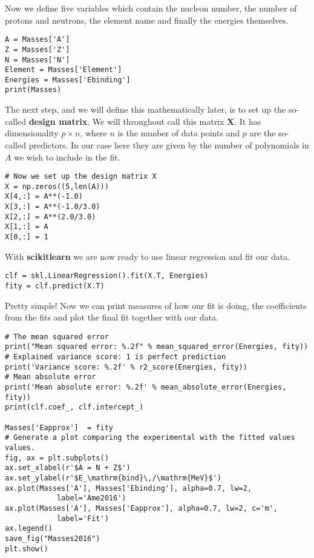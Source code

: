 \documentclass[%
oneside,                 %
final,                   %
10pt]{article}
\begin{document}
Now we define five variables which contain
the nucleon number, the number of protons and neutrons, the element name and finally the energies themselves.
\begin{verbatim}
A = Masses['A']
Z = Masses['Z']
N = Masses['N']
Element = Masses['Element']
Energies = Masses['Ebinding']
print(Masses)
\end{verbatim}
The next step, and we will define this mathematically later, is to set up the so-called \textbf{design matrix}. We will throughout call this matrix $\bm{X}$.
It has dimensionality $p\times n$, where $n$ is the number of data points and $p$ are the so-called predictors. In our case here they are given by the number of polynomials in $A$ we wish to include in the fit. 
\begin{verbatim}
# Now we set up the design matrix X
X = np.zeros((5,len(A)))
X[4,:] = A**(-1.0)
X[3,:] = A**(-1.0/3.0)
X[2,:] = A**(2.0/3.0)
X[1,:] = A
X[0,:] = 1
\end{verbatim}
With \textbf{scikitlearn} we are now ready to use linear regression and fit our data.
\begin{verbatim}
clf = skl.LinearRegression().fit(X.T, Energies)
fity = clf.predict(X.T)
\end{verbatim}
Pretty simple!  
Now we can print measures of how our fit is doing, the coefficients from the fits and plot the final fit together with our data.
\begin{verbatim}
# The mean squared error                               
print("Mean squared error: %.2f" % mean_squared_error(Energies, fity))
# Explained variance score: 1 is perfect prediction                                 
print('Variance score: %.2f' % r2_score(Energies, fity))
# Mean absolute error                                                           
print('Mean absolute error: %.2f' % mean_absolute_error(Energies, fity))
print(clf.coef_, clf.intercept_)

Masses['Eapprox']  = fity
# Generate a plot comparing the experimental with the fitted values values.
fig, ax = plt.subplots()
ax.set_xlabel(r'$A = N + Z$')
ax.set_ylabel(r'$E_\mathrm{bind}\,/\mathrm{MeV}$')
ax.plot(Masses['A'], Masses['Ebinding'], alpha=0.7, lw=2,
            label='Ame2016')
ax.plot(Masses['A'], Masses['Eapprox'], alpha=0.7, lw=2, c='m',
            label='Fit')
ax.legend()
save_fig("Masses2016")
plt.show()
\end{verbatim}
\end{document}
